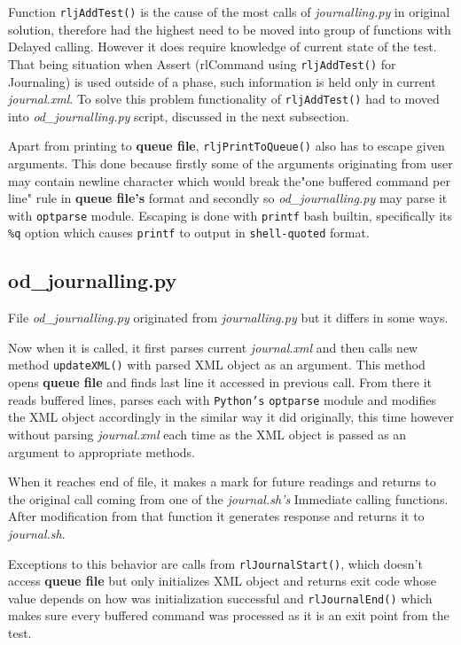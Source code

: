 Function \texttt{rljAddTest()} is the cause of the most calls of \textit{journalling.py} in original solution, therefore had the highest need to be moved into group of functions with Delayed calling. However it does require knowledge of current state of the test. That being situation when Assert (rlCommand using \texttt{rljAddTest()} for Journaling) is used outside of a phase, such information is held only in current \textit{journal.xml}. To solve this problem functionality of  \texttt{rljAddTest()} had to moved into \textit{{od\_journalling.py}} script, discussed in the next subsection.

Apart from printing to \textbf{queue file}, \texttt{rljPrintToQueue()} also has to escape given arguments. This done because firstly some of the arguments originating from user may contain newline character which would break the"one buffered command per line" rule in  \textbf{queue file's} format and secondly so \textit{od\_journalling.py} may parse it with \texttt{optparse} module.
Escaping is done with \texttt{printf} bash builtin\cite{bash_builtins}, specifically its \texttt{\%q} option which causes \texttt{printf} to output in \texttt{shell-quoted} format.

\subsection{od\_journalling.py}
File \textit{od\_journalling.py} originated from \textit{journalling.py} but it differs in some ways.

Now when it is called, it first parses current \textit{journal.xml} and then calls new method \texttt{updateXML()} with parsed XML object as an argument. This method opens \textbf{queue file} and finds last line it accessed in previous call. From there it reads buffered lines, parses each with \texttt{Python's} \texttt{optparse} module and modifies the XML object accordingly in the similar way it did originally, this time however without parsing \textit{journal.xml} each time as the XML object is passed as an argument to appropriate methods. 

When it reaches end of file, it makes a mark for future readings and returns to the original call coming from one of the \textit{journal.sh's}  Immediate calling functions. After modification from that function it generates response and returns it to \textit{journal.sh}. 

Exceptions to this behavior are calls  from \texttt{rlJournalStart()}, which doesn't access \textbf{queue file} but only initializes XML object and returns exit code whose value depends on how was initialization successful and \texttt{rlJournalEnd()} which makes sure every buffered command was processed as it is an exit point from the test.

